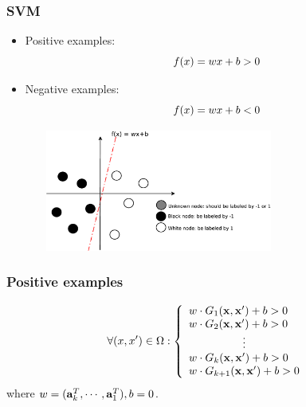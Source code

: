 \begin{frame}
\frametitle{SVM}
\begin{itemize}
\item Positive examples:
\begin{equation}
f(x) = wx+b > 0 \notag
\end{equation}
\item Negative examples:
\begin{equation}
f(x) = wx+b < 0 \notag
\end{equation}
\end{itemize}
\begin{figure}  %
  \includegraphics[width=8cm,height = 4cm]{pictures/SVM}  
\end{figure}
\end{frame}

\begin{frame}
\frametitle{Positive examples}
\begin{equation}
\forall (x, x') \in \Omega :
\left\{
	\begin{array}{ll}
		w \cdot G_{1}(\varsvec, \varsvec') +b > 0 \\
		w \cdot G_{2}(\varsvec, \varsvec') +b > 0 \\
		\multicolumn{1}{c}{\vdots} \\
        w \cdot G_{k}(\varsvec, \varsvec')  +b > 0 \\
		w \cdot G_{k+1}(\varsvec, \varsvec') +b > 0
	\end{array}
\right.\notag
\end{equation}
where $w = (\mathbf{a}^{T}_{k}, \cdots, \mathbf{a}^{T}_{1}), b = 0$.
\end{frame}

